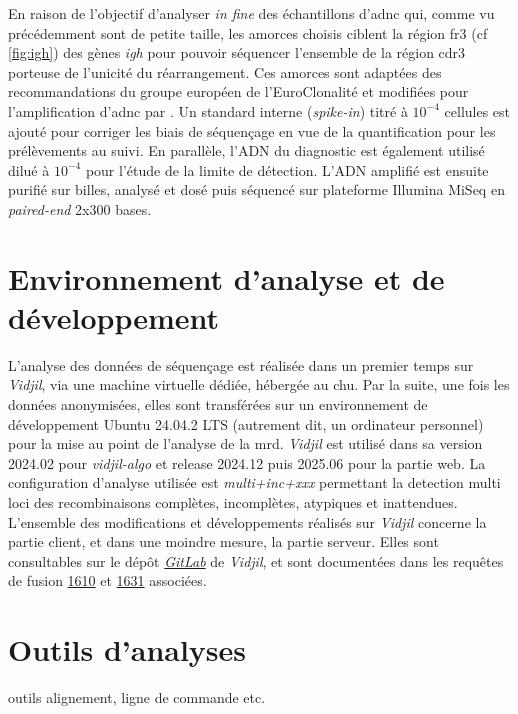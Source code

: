 En raison de l'objectif d'analyser \textit{in fine} des échantillons d'\gls{adnc} qui, comme vu précédemment sont de petite taille, 
les amorces choisis ciblent la région \gls{fr}3 (cf \autoref{fig:igh}) des gènes \textit{\gls{igh}} pour pouvoir séquencer l'ensemble de la 
région \gls{cdr}3 porteuse de l'unicité du réarrangement. 
Ces amorces sont adaptées des recommandations du groupe européen de l'EuroClonalité \cite{langerakEuroClonalityBIOMED2Guidelines2012} 
et modifiées pour l'amplification d'\gls{adnc} par \citeauthor{pottCfDNABasedNGSIG2022a} \cite{pottCfDNABasedNGSIG2022a}.
Un standard interne (\textit{spike-in}) titré à $10^{-4}$ cellules est ajouté pour corriger les biais de séquençage en vue de la quantification 
pour les prélèvements au suivi. En parallèle, l'ADN du diagnostic est également utilisé dilué à $10^{-4}$ pour l'étude de la limite de détection. 
L'ADN amplifié est ensuite purifié sur billes, analysé et dosé puis séquencé sur plateforme Illumina MiSeq en \textit{paired-end} 2x300 bases.

\section{Environnement d'analyse et de développement}

L'analyse des données de séquençage est réalisée dans un premier temps sur \textit{Vidjil}, via une machine virtuelle dédiée,
hébergée au \gls{chu}. Par la suite, une fois les données anonymisées, elles sont transférées sur un environnement de 
développement Ubuntu 24.04.2 LTS (autrement dit, un ordinateur personnel) pour la mise au point de l'analyse de la \gls{mrd}.
\textit{Vidjil} est utilisé dans sa version 2024.02 pour \textit{vidjil-algo} et release 2024.12 puis 2025.06 pour la partie 
web. La configuration d'analyse utilisée est \textit{multi+inc+xxx} permettant la detection multi loci des recombinaisons complètes, 
incomplètes, atypiques et inattendues.
L'ensemble des modifications et développements réalisés sur \textit{Vidjil} concerne la partie client, et dans une moindre mesure,
la partie serveur. Elles sont consultables sur le dépôt \href{https://gitlab.inria.fr/users/x-benha/activity}{\textit{GitLab}}
de \textit{Vidjil}, et sont documentées dans les requêtes de fusion \href{https://gitlab.inria.fr/vidjil/vidjil/-/merge_requests/1610}{1610}
et \href{https://gitlab.inria.fr/vidjil/vidjil/-/merge_requests/1631}{1631} associées.

\section{Outils d'analyses}

outils alignement, ligne de commande etc.


